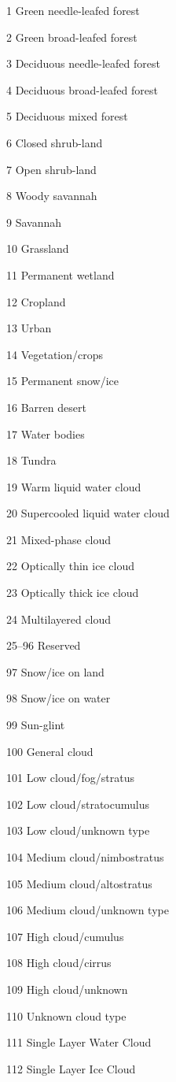 1 Green needle-leafed forest

2 Green broad-leafed forest

3 Deciduous needle-leafed forest

4 Deciduous broad-leafed forest

5 Deciduous mixed forest

6 Closed shrub-land

7 Open shrub-land

8 Woody savannah

9 Savannah

10 Grassland

11 Permanent wetland

12 Cropland

13 Urban

14 Vegetation/crops

15 Permanent snow/ice

16 Barren desert

17 Water bodies

18 Tundra

19 Warm liquid water cloud

20 Supercooled liquid water cloud

21 Mixed-phase cloud

22 Optically thin ice cloud

23 Optically thick ice cloud

24 Multilayered cloud

25--96 Reserved

97 Snow/ice on land

98 Snow/ice on water

99 Sun-glint

100 General cloud

101 Low cloud/fog/stratus

102 Low cloud/stratocumulus

103 Low cloud/unknown type

104 Medium cloud/nimbostratus

105 Medium cloud/altostratus

106 Medium cloud/unknown type

107 High cloud/cumulus

108 High cloud/cirrus

109 High cloud/unknown

110 Unknown cloud type

111 Single Layer Water Cloud

112 Single Layer Ice Cloud

